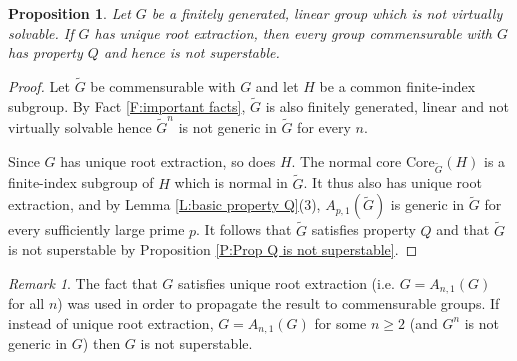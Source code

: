 \documentclass[11pt]{amsart}
\theoremstyle{plain}
\newtheorem{proposition}[theorem]{Proposition}
\theoremstyle{definition}
\theoremstyle{remark}
\newtheorem{remark}[theorem]{Remark}
\numberwithin{equation}{section}
\begin{document}
\begin{proposition}
    Let $G$ be a finitely generated, linear group which is not virtually solvable. If $G$ has unique root extraction, then every group commensurable with $G$ has property $Q$ and hence is not superstable.
\end{proposition}
\begin{proof}
    Let $\widetilde G$ be commensurable with $G$ and let $H$ be a common finite-index subgroup. By Fact \ref{F:important facts}, $\widetilde G$ is also finitely generated, linear and not virtually solvable hence $\widetilde G^n$ is not generic in $\widetilde G$ for every $n$.

    Since $G$ has unique root extraction, so does $H$. The normal core $\mathrm{Core}_{\widetilde G}(H)$ is a finite-index subgroup of $H$ which is normal in $\widetilde{G}$. It thus also has unique root extraction, and by Lemma \ref{L:basic property Q}(3), $A_{p,1}(\widetilde G)$ is generic in $\widetilde G$   for every sufficiently large prime $p$. It follows that $\widetilde G$ satisfies property $Q$ and that $\widetilde G$ is not superstable by Proposition \ref{P:Prop Q is not superstable}.
\end{proof}
\begin{remark}
    The fact that $G$ satisfies unique root extraction (i.e. $G=A_{n,1}(G)$ for all $n$) was used in order to propagate the result to commensurable groups. If instead of unique root extraction, $G=A_{n,1}(G)$ for some $n\geq 2$ (and $G^n$ is not generic in $G$) then $G$ is not superstable.
\end{remark}
\end{document}
